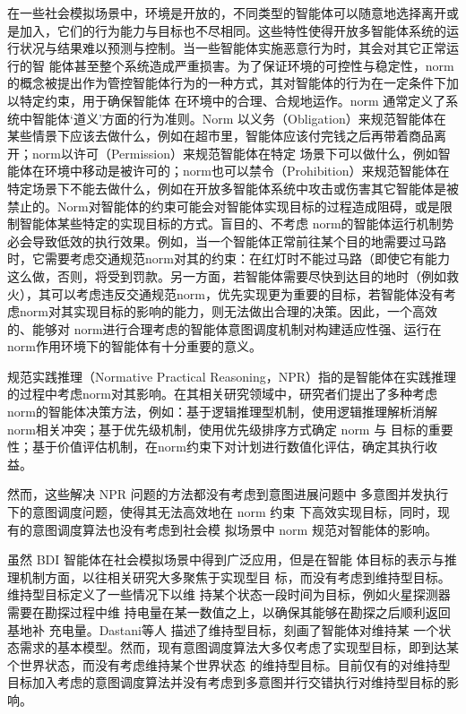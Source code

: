 在一些社会模拟场景中，环境是开放的，不同类型的智能体可以随意地选择离开或是加入，它们的行为能力与目标也不尽相同。这些特性使得开放多智能体系统的运行状况与结果难以预测与控制。当一些智能体实施恶意行为时，其会对其它正常运行的智 能体甚至整个系统造成严重损害。为了保证环境的可控性与稳定性，norm的概念被提出作为管控智能体行为的一种方式\cite{DBLP:journals/mags/SavarimuthuC11}，其对智能体的行为在一定条件下加以特定约束，用于确保智能体 在环境中的合理、合规地运作。norm 通常定义了系统中智能体‘道义’方面的行为准则。Norm 以义务（Obligation）来规范智能体在 某些情景下应该去做什么，例如在超市里，智能体应该付完钱之后再带着商品离开；norm以许可（Permission）来规范智能体在特定 场景下可以做什么，例如智能体在环境中移动是被许可的；norm也可以禁令（Prohibition）来规范智能体在特定场景下不能去做什么，例如在开放多智能体系统中攻击或伤害其它智能体是被禁止的。Norm对智能体的约束可能会对智能体实现目标的过程造成阻碍，或是限制智能体某些特定的实现目标的方式。盲目的、不考虑 norm的智能体运行机制势必会导致低效的执行效果。例如，当一个智能体正常前往某个目的地需要过马路时，它需要考虑交通规范norm对其的约束：在红灯时不能过马路（即使它有能力这么做，否则，将受到罚款。另一方面，若智能体需要尽快到达目的地时（例如救火），其可以考虑违反交通规范norm，优先实现更为重要的目标，若智能体没有考虑norm对其实现目标的影响的能力，则无法做出合理的决策。因此，一个高效的、能够对 norm进行合理考虑的智能体意图调度机制对构建适应性强、运行在norm作用环境下的智能体有十分重要的意义。

规范实践推理（Normative Practical Reasoning，NPR）指的是智能体在实践推理的过程中考虑norm对其影响。在其相关研究领域中，研究者们提出了多种考虑norm的智能体决策方法，例如：基于逻辑推理型机制\cite{DBLP:conf/agents/BroersenDHHT01,DBLP:conf/ijcai/KollingbaumN03}，使用逻辑推理解析消解norm相关冲突；基于优先级机制\cite{DBLP:conf/aamas/AlechinaDL12,DBLP:conf/dalt/LeePLDA14}，使用优先级排序方式确定 norm 与 目标的重要性；基于价值评估机制\cite{DBLP:journals/eaai/MeneguzziROVL15}，在norm约束下对计划进行数值化评估，确定其执行收益。

然而，这些解决 NPR 问题的方法都没有考虑到意图进展问题中 多意图并发执行下的意图调度问题，使得其无法高效地在 norm 约束 下高效实现目标，同时，现有的意图调度算法也没有考虑到社会模 拟场景中 norm 规范对智能体的影响。

虽然 BDI 智能体在社会模拟场景中得到广泛应用，但是在智能 体目标的表示与推理机制方面，以往相关研究大多聚焦于实现型目 标，而没有考虑到维持型目标。维持型目标定义了一些情况下以维 持某个状态一段时间为目标，例如火星探测器需要在勘探过程中维 持电量在某一数值之上，以确保其能够在勘探之后顺利返回基地补 充电量。Dastani等人\cite{DBLP:conf/atal/DastaniRM06} 描述了维持型目标，刻画了智能体对维持某 一个状态需求的基本模型。然而，现有意图调度算法大多仅考虑了实现型目标，即到达某个世界状态，而没有考虑维持某个世界状态 的维持型目标。目前仅有的对维持型目标加入考虑的意图调度算法\cite{DBLP:conf/atal/DuffHT06,DBLP:journals/ci/DuffTH14,DBLP:conf/dalt/HindriksR07}并没有考虑到多意图并行交错执行对维持型目标的影响。

